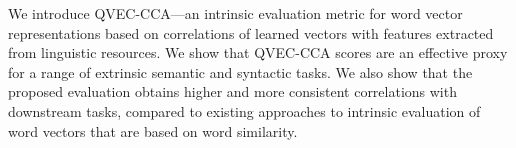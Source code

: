 We introduce QVEC-CCA—an intrinsic evaluation metric for word vector representations based on correlations of learned vectors with features extracted from linguistic resources. We show that QVEC-CCA scores are an effective proxy for a range of extrinsic semantic and syntactic tasks. We also show that the proposed evaluation obtains higher and more consistent correlations with downstream tasks, compared to existing approaches to intrinsic evaluation of word vectors that are based on word similarity.
